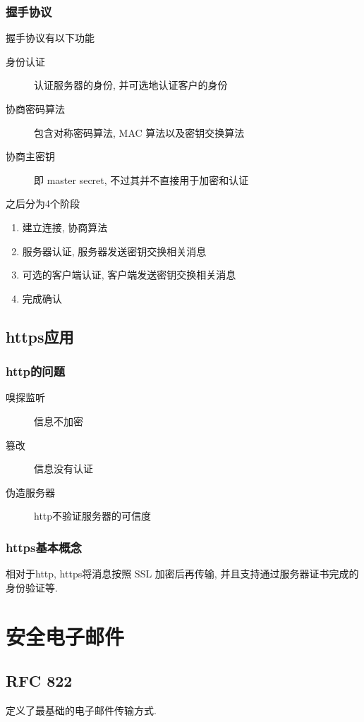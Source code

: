 \documentclass{ctexart}
\begin{document}
\subsubsection{握手协议} 握手协议有以下功能\begin{description}
        \item[身份认证] 认证服务器的身份, 并可选地认证客户的身份
        \item[协商密码算法] 包含对称密码算法, MAC 算法以及密钥交换算法
        \item[协商主密钥] 即 master secret, 不过其并不直接用于加密和认证
    \end{description} 之后分为4个阶段\begin{enumerate}
        \item 建立连接, 协商算法
        \item 服务器认证, 服务器发送密钥交换相关消息
        \item 可选的客户端认证, 客户端发送密钥交换相关消息
        \item 完成确认
    \end{enumerate}
\subsection{https应用}
\subsubsection{http的问题}
    \begin{description}
        \item[嗅探监听] 信息不加密
        \item[篡改] 信息没有认证
        \item[伪造服务器] http不验证服务器的可信度
    \end{description}
\subsubsection{https基本概念}
    相对于http, https将消息按照 SSL 加密后再传输, 并且支持通过服务器证书完成的身份验证等.


\section{安全电子邮件}
\subsection{RFC 822}
    定义了最基础的电子邮件传输方式.\par
\end{document}
